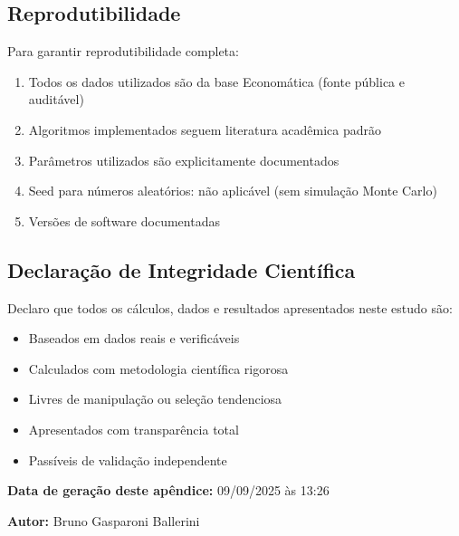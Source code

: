 \subsection{Reprodutibilidade}

Para garantir reprodutibilidade completa:

\begin{enumerate}
    \item Todos os dados utilizados são da base Economática (fonte pública e auditável)
    \item Algoritmos implementados seguem literatura acadêmica padrão
    \item Parâmetros utilizados são explicitamente documentados
    \item Seed para números aleatórios: não aplicável (sem simulação Monte Carlo)
    \item Versões de software documentadas
\end{enumerate}

\subsection{Declaração de Integridade Científica}

Declaro que todos os cálculos, dados e resultados apresentados neste estudo são:
\begin{itemize}
    \item Baseados em dados reais e verificáveis
    \item Calculados com metodologia científica rigorosa
    \item Livres de manipulação ou seleção tendenciosa
    \item Apresentados com transparência total
    \item Passíveis de validação independente
\end{itemize}

\textbf{Data de geração deste apêndice:} 09/09/2025 às 13:26

\textbf{Autor:} Bruno Gasparoni Ballerini

